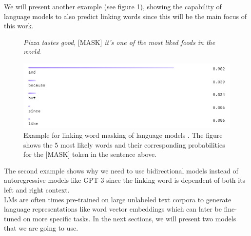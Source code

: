 We will present another example (see figure \ref{fig:bert_masking_example2}), showing the capability of language models to also predict linking words since this will be the main focus of this work.

\begin{figure}[H]
  \begin{center}
	\textit{Pizza tastes good}, [MASK] \textit{it's one of the most liked foods in the world}.
  \end{center}
  \centering
  \includegraphics[scale=0.9]{fig/bert_masking_example2.png}
  \caption{Example for linking word masking of language models \cite{bertexample2}. The figure shows the 5 most likely words and their corresponding probabilities for the [MASK] token in the sentence above.}%
  \label{fig:bert_masking_example2}
\end{figure}

The second example shows why we need to use bidirectional models instead of autoregressive models like GPT-3 since the linking word is dependent of both its left and right context. \\
LMs are often times pre-trained on large unlabeled text corpora to generate language representations like word vector embeddings which can later be fine-tuned on more specific tasks. In the next sections, we will present two models that we are going to use.



